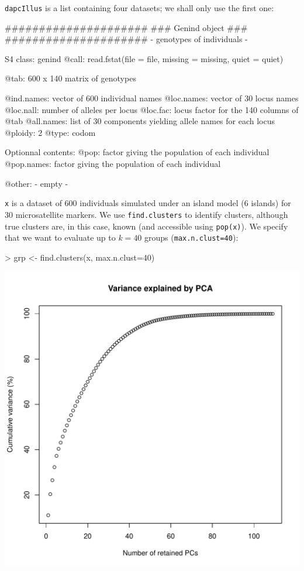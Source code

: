 \documentclass{article}
\newcommand{\code}[1]{{{\tt #1}}}
\begin{document}
\texttt{dapcIllus} is a list containing four datasets; we shall only use the first one:
\begin{Schunk}
\begin{Soutput}
   #####################
   ### Genind object ### 
   #####################
- genotypes of individuals - 

S4 class:  genind
@call: read.fstat(file = file, missing = missing, quiet = quiet)

@tab:  600 x 140 matrix of genotypes

@ind.names: vector of  600 individual names
@loc.names: vector of  30 locus names
@loc.nall: number of alleles per locus
@loc.fac: locus factor for the  140 columns of @tab
@all.names: list of  30 components yielding allele names for each locus
@ploidy:  2
@type:  codom

Optionnal contents: 
@pop:  factor giving the population of each individual
@pop.names:  factor giving the population of each individual

@other: - empty -
\end{Soutput}
\end{Schunk}
\texttt{x} is a dataset of 600 individuals simulated under an island model (6 islands) for 30 microsatellite markers.
We use \code{find.clusters} to identify clusters, although true clusters are, in this case, known
(and accessible using \texttt{pop(x)}).
We specify that we want to evaluate up to $k=40$ groups (\texttt{max.n.clust=40}):
\begin{Schunk}
\begin{Sinput}
> grp <- find.clusters(x, max.n.clust=40)
\end{Sinput}
\end{Schunk}

\begin{center}
  \includegraphics[width=.7\textwidth]{findclust-pca.pdf}
\end{center}
\end{document}
